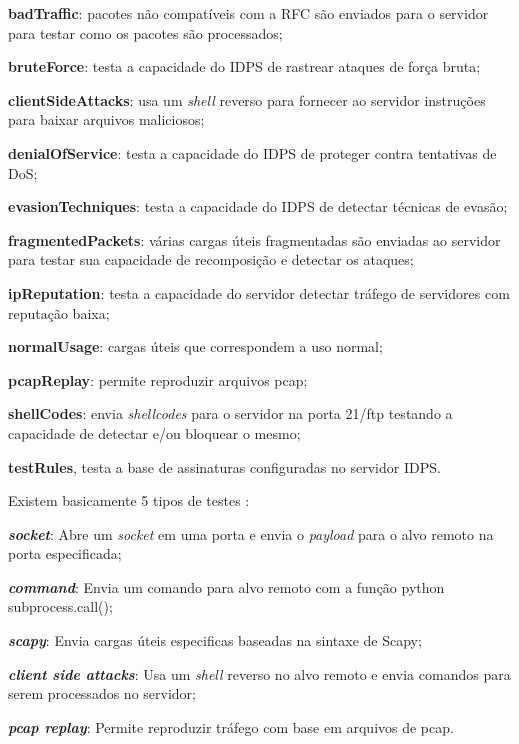  \begin{alineas}
  \item \textbf{badTraffic}: pacotes não compatíveis com a RFC são enviados para o servidor para testar como os pacotes são processados; 
  \item \textbf{bruteForce}: testa a capacidade do IDPS de rastrear ataques de força bruta;
  \item \textbf{clientSideAttacks}: usa um \textit{shell} reverso para fornecer ao servidor instruções para baixar arquivos maliciosos; 
  \item \textbf{denialOfService}: testa a capacidade do IDPS de proteger contra tentativas de DoS; 
  \item \textbf{evasionTechniques}: testa a capacidade do IDPS de detectar técnicas de evasão; 
  \item \textbf{fragmentedPackets}: várias cargas úteis fragmentadas são enviadas ao servidor para testar sua capacidade de recomposição e detectar os ataques; 
  \item \textbf{ipReputation}: testa a capacidade do servidor detectar tráfego de servidores com reputação baixa;
  \item \textbf{normalUsage}: cargas úteis que correspondem a uso normal; 
  \item \textbf{pcapReplay}: permite reproduzir arquivos pcap; 
  \item \textbf{shellCodes}: envia \textit{shellcodes} para o servidor na porta 21/ftp testando a capacidade de detectar e/ou bloquear o mesmo; 
  \item \textbf{testRules}, testa a base de assinaturas configuradas no servidor IDPS.
 \end{alineas}

Existem basicamente 5 tipos de testes \cite{pytbull}: 
\begin{alineas}
\item \textbf{\textit{socket}}: Abre um \textit{socket} em uma porta e envia o \textit{payload} para o alvo remoto na porta especificada; 
\item \textbf{\textit{command}}: Envia um comando para alvo remoto com a função python subprocess.call(); 
\item \textbf{\textit{scapy}}: Envia cargas úteis especificas baseadas na sintaxe de Scapy;
\item \textbf{\textit{client side attacks}}: Usa um \textit{shell} reverso no alvo remoto e envia comandos para serem processados no servidor; 
\item \textbf{\textit{pcap replay}}: Permite reproduzir tráfego com base em arquivos de pcap.
\end{alineas}


